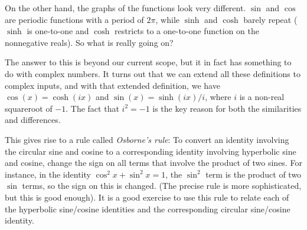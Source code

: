 \documentclass{amsart}
\begin{document}
On the other hand, the graphs of the functions look very
different. $\sin$ and $\cos$ are periodic functions with a period of
$2\pi$, while $\sinh$ and $\cosh$ barely repeat ($\sinh$ is one-to-one
and $\cosh$ restricts to a one-to-one function on the nonnegative
reals). So what is really going on?

The answer to this is beyond our current scope, but it in fact has
something to do with complex numbers. It turns out that we can extend
all these definitions to complex inputs, and with that extended
definition, we have $\cos(x) = \cosh(ix)$ and $\sin(x) = \sinh(ix)/i$,
where $i$ is a non-real squareroot of $-1$. The fact that $i^2 = -1$
is the key reason for both the similarities and differences.

This gives rise to a rule called {\em Osborne's rule}: To convert an
identity involving the circular sine and cosine to a corresponding
identity involving hyperbolic sine and cosine, change the sign on all
terms that involve the product of two sines. For instance, in the
identity $\cos^2 x + \sin^2 x = 1$, the $\sin^2$ term is the product
of two $\sin$ terms, so the sign on this is changed. (The precise rule
is more sophisticated, but this is good enough). It is a good exercise
to use this rule to relate each of the hyperbolic sine/cosine
identities and the corresponding circular sine/cosine identity.
\end{document}
